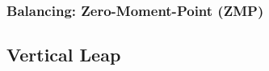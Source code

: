 		\subsubsection{Balancing: Zero-Moment-Point (ZMP)}
			
	\subsection{Vertical Leap}
		

%
%
%
%
%
%

%
%
%

%
%
%
